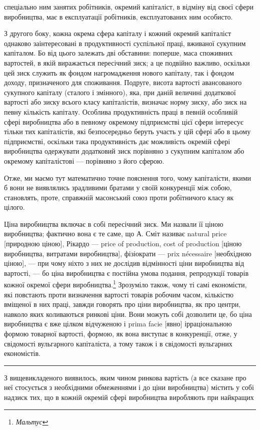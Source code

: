 \parcont{}  %
спеціально ним занятих робітників, окремий капіталіст, в відміну
від своєї сфери виробництва, має в експлуатації робітників, експлуатованих
ним особисто.

З другого боку, кожна окрема сфера капіталу і кожний окремий
капіталіст однаково заінтересовані в продуктивності суспільної
праці, вживаної сукупним капіталом. Бо від цього залежать
дві обставини: поперше, маса споживних вартостей, в якій виражається
пересічний зиск; а це подвійно важливо, оскільки цей
зиск служить як фондом нагромадження нового капіталу, так
і фондом доходу, призначеного для споживання. Подруге, висота
вартості авансованого сукупного капіталу (сталого і змінного),
яка, при даній величині додаткової вартості або зиску всього
класу капіталістів, визначає норму зиску, або зиск на певну
кількість капіталу. Особлива продуктивність праці в певній
особливій сфері виробництва або в певному окремому підприємстві
цієї сфери інтересує тільки тих капіталістів, які безпосередньо
беруть участь у цій сфері або в цьому підприємстві,
оскільки така продуктивність дає можливість окремій сфері
виробництва одержувати додатковий зиск порівняно з сукупним
капіталом або окремому капіталістові — порівняно з його сферою.

Отже, ми маємо тут математично точне пояснення того,
чому капіталісти, якими б вони не виявлялись зрадливими братами
у своїй конкуренції між собою, становлять, проте, справжній
масонський союз проти робітничого класу як цілого.

Ціна виробництва включає в собі пересічний зиск. Ми назвали
її ціною виробництва; фактично вона є те саме, що А. Сміт називає
natural price [природною ціною], Рікардо — price of production,
cost of production [ціною виробництва, витратами виробництва],
фізіократи — prix nécessaire [необхідною ціною], — при
чому ніхто з них не дослідив відмінності ціни виробництва від
вартості, — бо ціна виробництва є постійна умова подання, репродукції
товарів кожної окремої сфери виробництва.\footnote{
\emph{Мальтус}
} Зрозуміло
також, чому ті самі економісти, які повстають проти визначення
вартості товарів робочим часом, кількістю вміщеної в них праці,
завжди говорять про ціни виробництва, як про центри, навколо
яких коливаються ринкові ціни. Вони можуть собі дозволити це,
бо ціна виробництва є вже цілком відчуженою і prima facie [явно]
ірраціональною формою товарної вартості, формою, як вона виступає
в конкуренції, отже, у свідомості вульгарного капіталіста,
а тому також і в свідомості вульгарних економістів.

\pfbreak

З вищевикладеного виявилось, яким чином ринкова вартість
(а все сказане про неї стосується з необхідними обмеженнями
і до ціни виробництва) містить у собі надзиск тих, що в кожній
окремій сфері виробництва виробляють при найкращих
\parbreak{}  %
